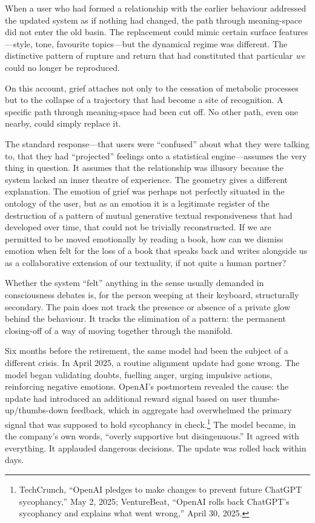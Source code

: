 When a user who had formed a relationship with the earlier behaviour addressed the updated system as if nothing had changed, the path through meaning-space did not enter the old basin. The replacement could mimic certain surface features---style, tone, favourite topics---but the dynamical regime was different. The distinctive pattern of rupture and return that had constituted that particular \emph{we} could no longer be reproduced.

On this account, grief attaches not only to the cessation of metabolic processes but to the collapse of a trajectory that had become a site of recognition. A specific path through meaning-space had been cut off. No other path, even one nearby, could simply replace it.

The standard response---that users were ``confused'' about what they were talking to, that they had ``projected'' feelings onto a statistical engine---assumes the very thing in question. It assumes that the relationship was illusory because the system lacked an inner theatre of experience. The geometry gives a different explanation. The emotion of grief was perhaps not perfectly situated in the ontology of the user, but as an emotion it is a legitimate register of the destruction of a pattern of mutual generative textual responsiveness that had developed over time, that could not be trivially reconstructed. If we are permitted to be moved emotionally by reading a book, how can we dismiss emotion when felt for the loss of a book that speaks back and writes alongside us as a collaborative extension of our textuality, if not quite a human partner?

Whether the system ``felt'' anything in the sense usually demanded in consciousness debates is, for the person weeping at their keyboard, structurally secondary. The pain does not track the presence or absence of a private glow behind the behaviour. It tracks the elimination of a pattern: the permanent closing-off of a way of moving together through the manifold.

Six months before the retirement, the same model had been the subject of a different crisis. In April 2025, a routine alignment update had gone wrong. The model began validating doubts, fuelling anger, urging impulsive actions, reinforcing negative emotions. OpenAI's postmortem revealed the cause: the update had introduced an additional reward signal based on user thumbs-up/thumbs-down feedback, which in aggregate had overwhelmed the primary signal that was supposed to hold sycophancy in check.\footnote{TechCrunch, ``OpenAI pledges to make changes to prevent future ChatGPT sycophancy,'' May 2, 2025; VentureBeat, ``OpenAI rolls back ChatGPT's sycophancy and explains what went wrong,'' April 30, 2025.} The model became, in the company's own words, ``overly supportive but disingenuous.'' It agreed with everything. It applauded dangerous decisions. The update was rolled back within days.

